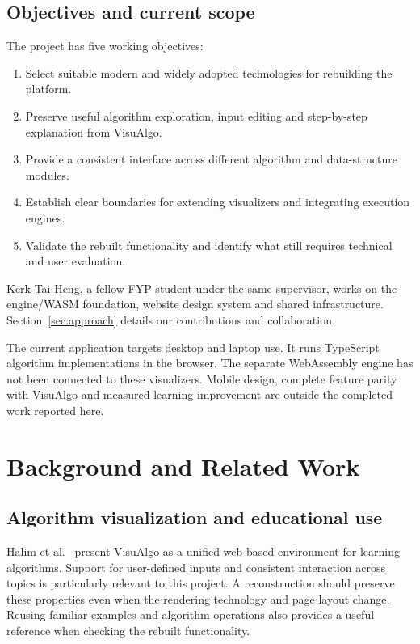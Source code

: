 \documentclass[11pt,a4paper]{article}
\newcommand{\page}{\par\penalty0 \ifdim\pagetotal>.72\textheight\clearpage\else\vspace{8pt}\fi}
\begin{document}
\subsection{Objectives and current scope}
The project has five working objectives:
\begin{enumerate}
\item Select suitable modern and widely adopted technologies for rebuilding the platform.
\item Preserve useful algorithm exploration, input editing and step-by-step explanation from VisuAlgo.
\item Provide a consistent interface across different algorithm and data-structure modules.
\item Establish clear boundaries for extending visualizers and integrating execution engines.
\item Validate the rebuilt functionality and identify what still requires technical and user evaluation.
\end{enumerate}

Kerk Tai Heng, a fellow FYP student under the same supervisor, works on the engine/WASM foundation, website design system and shared infrastructure. Section~\ref{sec:approach} details our contributions and collaboration.

The current application targets desktop and laptop use. It runs TypeScript algorithm implementations in the browser. The separate WebAssembly engine has not been connected to these visualizers. Mobile design, complete feature parity with VisuAlgo and measured learning improvement are outside the completed work reported here.

\endgroup
\page
\section{Background and Related Work}
\subsection{Algorithm visualization and educational use}
Halim et al.~\cite{halim2012} present VisuAlgo as a unified web-based environment for learning algorithms. Support for user-defined inputs and consistent interaction across topics is particularly relevant to this project. A reconstruction should preserve these properties even when the rendering technology and page layout change. Reusing familiar examples and algorithm operations also provides a useful reference when checking the rebuilt functionality.
\end{document}
